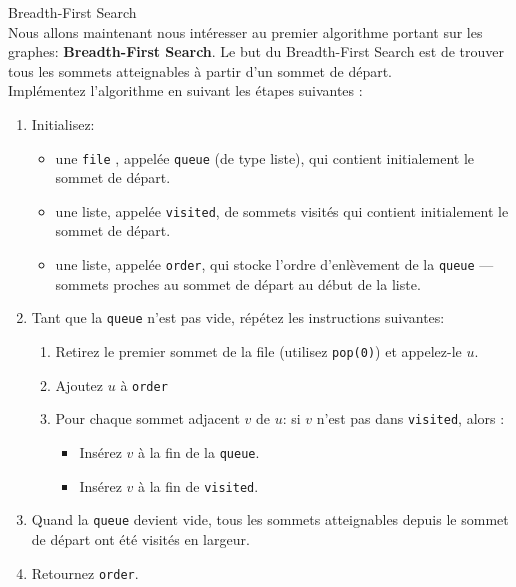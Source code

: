 \begin{Exercice}[20 minutes]  [Python] Breadth-First Search \\
    Nous allons maintenant nous intéresser au premier algorithme portant sur les graphes\!: \textbf{Breadth-First Search}. Le but du Breadth-First Search est de trouver tous les sommets atteignables à partir d'un sommet de départ.\\

    Implémentez l'algorithme en suivant les étapes suivantes :\\
\begin{enumerate}

\item Initialisez\!:
\begin{itemize}
    \item une \texttt{file} , appelée \texttt{queue} (de type liste), qui contient initialement le sommet de départ.
    \item une liste, appelée \texttt{visited}, de sommets visités qui contient initialement le sommet de départ.
    \item une liste, appelée \texttt{order}, qui stocke l'ordre d'enlèvement de la \texttt{queue} — sommets proches au sommet de départ au début de la liste.
\end{itemize}

\item Tant que la \texttt{queue} n'est pas vide, répétez les instructions suivantes\!:
\begin{enumerate}
    \item Retirez le premier sommet de la file (utilisez \texttt{pop(0)}) et appelez-le $u$. 
    \item Ajoutez $u$ à \texttt{order}
    \item Pour chaque sommet adjacent $v$ de $u$\!: si $v$ n'est pas dans \texttt{visited}, alors :
        \begin{itemize}
            \item Insérez $v$ à la fin de la \texttt{queue}.
            \item Insérez $v$ à la fin de \texttt{visited}.
        \end{itemize}
\end{enumerate}

\item Quand la \texttt{queue} devient vide, tous les sommets atteignables depuis le sommet de départ ont été visités en largeur.
\item Retournez \texttt{order}.
\end{enumerate}


\end{Exercice}
